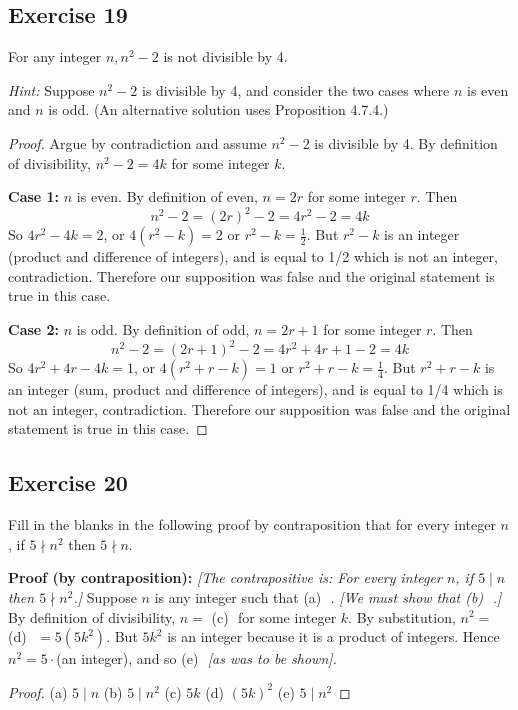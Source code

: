 \documentclass[14pt]{extarticle}
\newcommand{\fbl}{\underline{\hspace{1cm}}\,\,}
\newcommand{\cy}{\color{cyan}}
\begin{document}
\subsection{Exercise 19}
For any integer $n, n^2 - 2$ is not divisible by 4.

{\it Hint:} Suppose $n^2 - 2$ is divisible by 4, and consider the two cases where $n$ is even and $n$ is odd. (An alternative solution uses Proposition 4.7.4.)

\begin{proof}
Argue by contradiction and assume $n^2 - 2$ is divisible by 4. By definition of divisibility, $n^2-2 = 4k$ for some integer $k$.

{\bf Case 1:} $n$ is even. By definition of even, $n = 2r$ for some integer $r$. Then
\[
n^2 - 2 = (2r)^2-2 = 4r^2-2 = 4k
\]
So $4r^2-4k = 2$, or $4(r^2-k) = 2$ or $r^2-k = \frac{1}{2}$. But $r^2-k$ is an integer (product and difference of integers), and is equal to 1/2 which is not an integer, contradiction. Therefore our supposition was false and the original statement is true in this case.

{\bf Case 2:} $n$ is odd. By definition of odd, $n = 2r+1$ for some integer $r$. Then
\[
n^2 - 2 = (2r+1)^2-2 = 4r^2+4r+1-2 = 4k
\]
So $4r^2+4r-4k = 1$, or $4(r^2+r-k) = 1$ or $r^2+r-k = \frac{1}{4}$. But $r^2+r-k$ is an integer (sum, product and difference of integers), and is equal to 1/4 which is not an integer, contradiction. Therefore our supposition was false and the original statement is true in this case.
\end{proof}

\subsection{Exercise 20}
Fill in the blanks in the following proof by contraposition that for every integer $n$, if $5 \nmid n^2$ then $5 \nmid n$.

{\bf Proof (by contraposition):} {\it[The contrapositive is: For every integer $n$, if $5 \mid n$ then $5 \nmid n^2$.]} Suppose $n$ is any integer such that {\cy (a)} \fbl. {\it[We must show that {\cy(b)} \fbl.]} By definition of divisibility, $n = $ {\cy(c)} \fbl for some integer $k$. By substitution, $n^2 = $ {\cy(d)} \fbl $= 5(5k^2)$. But $5k^2$ is an integer because it is a product of integers. Hence $n^2 = 5\cdot$(an integer), and so {\cy(e)} \fbl {\it[as was to be shown].}

\begin{proof}
(a) $5 \mid n$ (b) $5 \mid n^2$ (c) $5k$ (d) $(5k)^2$ (e) $5 \mid n^2$
\end{proof}
\end{document}
